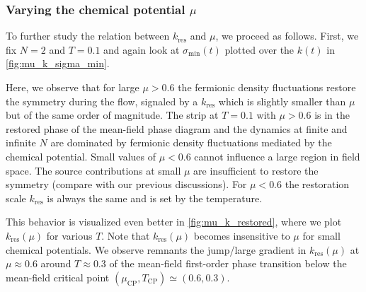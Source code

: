 \subsubsection{Varying the chemical potential \texorpdfstring{$\mu$}{mu}}\label{subsubsec:variablemu}
To further study the relation between $k_\mathrm{res}$ and $\mu$, we proceed as follows. First, we fix $N = 2$ and $T = 0.1$ and again look at $\sigma_\mathrm{min} ( t )$ plotted over the \rgscale{} $k ( t )$ in \cref{fig:mu_k_sigma_min}.

Here, we observe that for large $\mu>0.6$ the fermionic density fluctuations restore the symmetry during the \frg{} flow, signaled by a $k_\mathrm{res}$ which is slightly smaller than $\mu$ but of the same order of magnitude. The strip at $T=0.1$ with $\mu>0.6$ is in the restored phase of the mean-field phase diagram and the dynamics at finite and infinite $N$ are dominated by fermionic density fluctuations mediated by the chemical potential. Small values of $\mu<0.6$ cannot influence a large region in field space. The source contributions at small $\mu$ are insufficient to restore the symmetry (compare with our previous discussions). For $\mu<0.6$ the restoration scale $k_\mathrm{res}$ is always the same and is set by the temperature.

This behavior is visualized even better in \cref{fig:mu_k_restored}, where we plot $k_\mathrm{res} ( \mu )$ for various $T$.
Note that $k_\mathrm{res} ( \mu )$ becomes insensitive to $\mu$ for small chemical potentials. We observe remnants \dash{} the jump/large gradient in $k_\mathrm{res} ( \mu )$ at $\mu\approx 0.6$ around $T\approx0.3$ \dash{}  of the mean-field first-order phase transition below the mean-field critical point $(\mu_\mathrm{CP},T_\mathrm{CP})\simeq(0.6,0.3)$.\clearpage

